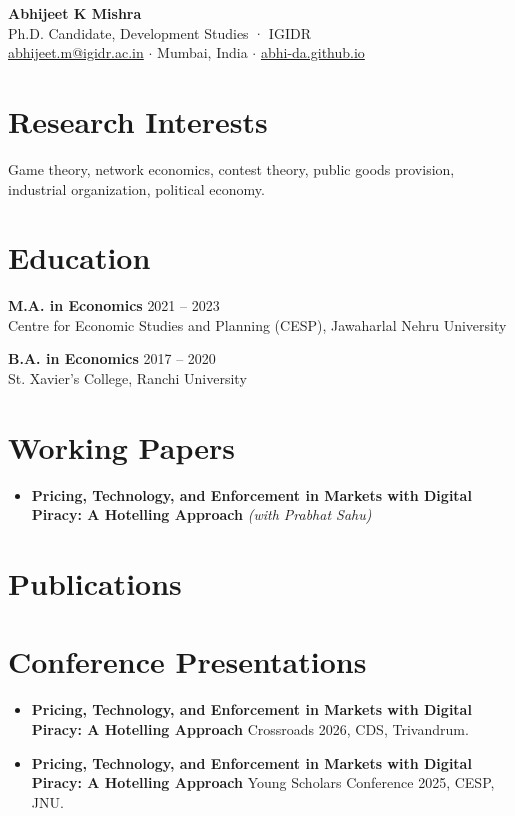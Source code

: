 \documentclass[11pt,letterpaper]{article}
\newcommand{\cvitem}[3]{%
  \noindent\textbf{#1} \hfill {\color{muted}#2}\\
  #3\par\vspace{0.55em}
}
\begin{document}
\begin{center}
  {\Huge\bfseries\color{accent} Abhijeet K Mishra}\\[0.3em]
{\color{muted} Ph.D. Candidate, Development Studies · IGIDR}\\[0.15em]  {\small \href{mailto:abhijeet.m@igidr.ac.in}{abhijeet.m@igidr.ac.in} \; $\cdot$ \; Mumbai, India \; $\cdot$ \; \href{https://abhi-da.github.io}{abhi-da.github.io}}
\end{center}
\vspace{0.6em}

\section*{Research Interests}

Game theory, network economics, contest theory, public goods provision, industrial organization, political economy.

\section*{Education}

\cvitem{M.A. in Economics}{2021 -- 2023}{%
Centre for Economic Studies and Planning (CESP), Jawaharlal Nehru University}
\cvitem{B.A. in Economics}{2017 -- 2020}{%
St. Xavier's College, Ranchi University}

\section*{Working Papers}

\begin{itemize}[leftmargin=1.1em, itemsep=0.5em, topsep=0pt]
  \item \textbf{Pricing, Technology, and Enforcement in Markets with Digital Piracy: A Hotelling Approach} \textit{(with Prabhat Sahu)}
\end{itemize}

\section*{Publications}



\section*{Conference Presentations}

\begin{itemize}[leftmargin=1.1em, itemsep=0.5em, topsep=0pt]
  \item \textbf{Pricing, Technology, and Enforcement in Markets with Digital Piracy: A Hotelling Approach} Crossroads 2026, CDS, Trivandrum.
  \item \textbf{Pricing, Technology, and Enforcement in Markets with Digital Piracy: A Hotelling Approach} Young Scholars Conference 2025, CESP, JNU.
\end{itemize}
\end{document}
